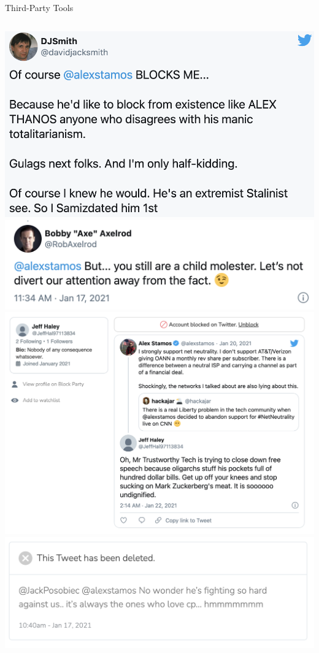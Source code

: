 \documentclass[nobackground,dvipsnames,table,aspectratio=169]{beamer}
\begin{document}
\begin{frame}{Third-Party Tools}
    \begin{columns}
            \includegraphics[width=\textwidth]{blocked-by-stamos}
            \includegraphics[width=\textwidth]{blocked-by-stamos-3}
            \includegraphics[width=\textwidth]{blocked-by-stamos-2}
            \includegraphics[width=\textwidth]{deleted-harassment-tweet}
    \end{columns}
\end{frame}
\end{document}
